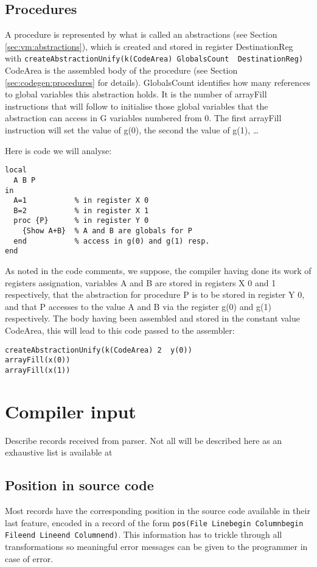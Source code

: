 \documentclass[a4paper]{memoir}
\begin{document}
\subsection{Procedures}\label{sec:opcode:procedures}
A procedure is represented by what is called an abstractions (see Section \ref{sec:vm:abstractions}), which is created and stored in register DestinationReg with
\lstinline!createAbstractionUnify(k(CodeArea) GlobalsCount  DestinationReg)!
CodeArea is the assembled body of the procedure (see Section \ref{sec:codegen:procedures} for details). GlobalsCount identifies how many references to global variables this abstraction holds. It is the number of arrayFill instructions that will follow to initialise those global variables that the abstraction can access in G variables numbered from 0. The first arrayFill instruction will set the value of g(0), the second the value of g(1), \ldots

Here is code we will analyse:

\begin{lstlisting}
local
  A B P
in
  A=1           % in register X 0
  B=2           % in register X 1
  proc {P}      % in register Y 0
    {Show A+B}  % A and B are globals for P
  end           % access in g(0) and g(1) resp.
end
\end{lstlisting}

As noted in the code comments, we suppose, the compiler having done its work of registers assignation, variables A and B are stored in registers X 0 and 1 respectively, that the abstraction for procedure P is to be stored in register Y 0, and that P accesses to the value A and B via the register g(0) and g(1) respectively.
The body having been assembled and stored in the constant value CodeArea, this will lead to this code passed to the assembler:
\begin{lstlisting}
createAbstractionUnify(k(CodeArea) 2  y(0))
arrayFill(x(0))
arrayFill(x(1))
\end{lstlisting}



\section{Compiler input}\label{section:compilerinput}
Describe records received from parser.
Not all will be described here as an exhaustive list is available at %
\subsection{Position in source code}
Most records have the corresponding position in the source code available in their last feature, encoded in a record of the form \lstinline!pos(File Linebegin Columnbegin Fileend Lineend Columnend)!. This information has to trickle through all transformations so meaningful error messages can be given to the programmer in case of error.
\end{document}
